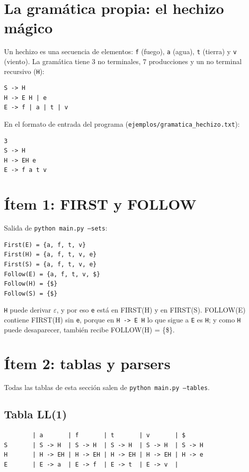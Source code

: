 \documentclass[11pt,a4paper]{article}
\newcommand{\code}[1]{\texttt{#1}}
\begin{document}
\section{La gramática propia: el hechizo mágico}

Un hechizo es una secuencia de elementos: \code{f} (fuego), \code{a} (agua), \code{t} (tierra) y \code{v} (viento). La gramática tiene 3 no terminales, 7 producciones y un no terminal recursivo (\code{H}):

\begin{Verbatim}
S -> H
H -> E H | e
E -> f | a | t | v
\end{Verbatim}

En el formato de entrada del programa (\code{ejemplos/gramatica\_hechizo.txt}):

\begin{Verbatim}
3
S -> H
H -> EH e
E -> f a t v
\end{Verbatim}

\section{Ítem 1: FIRST y FOLLOW}

Salida de \code{python main.py --sets}:

\begin{Verbatim}
First(E) = {a, f, t, v}
First(H) = {a, f, t, v, e}
First(S) = {a, f, t, v, e}
Follow(E) = {a, f, t, v, $}
Follow(H) = {$}
Follow(S) = {$}
\end{Verbatim}

\code{H} puede derivar $\varepsilon$, y por eso \code{e} está en FIRST(H) y en FIRST(S). FOLLOW(E) contiene FIRST(H) sin \code{e}, porque en \code{H -> E H} lo que sigue a \code{E} es \code{H}; y como \code{H} puede desaparecer, también recibe FOLLOW(H) = \{\$\}.

\section{Ítem 2: tablas y parsers}

Todas las tablas de esta sección salen de \code{python main.py --tables}.

\subsection{Tabla LL(1)}

\begin{Verbatim}
        | a       | f       | t       | v       | $
S       | S -> H  | S -> H  | S -> H  | S -> H  | S -> H
H       | H -> EH | H -> EH | H -> EH | H -> EH | H -> e
E       | E -> a  | E -> f  | E -> t  | E -> v  |
\end{Verbatim}
\end{document}
